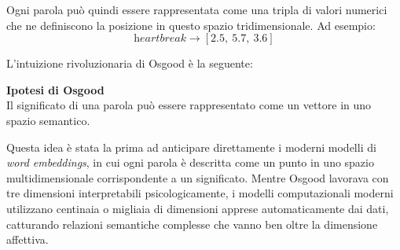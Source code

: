Ogni parola può quindi essere rappresentata come una tripla di valori numerici che ne definiscono la posizione in questo spazio tridimensionale. Ad esempio:
\[
\textit{heartbreak} \rightarrow [2.5,\ 5.7,\ 3.6]
\]

L'intuizione rivoluzionaria di Osgood è la seguente:

\begin{notebox}
\textbf{Ipotesi di Osgood}\\
Il significato di una parola può essere rappresentato come un vettore in uno spazio semantico.
\end{notebox}

Questa idea è stata la prima ad anticipare direttamente i moderni modelli di \textit{word embeddings}, in cui ogni parola è descritta come un punto in uno spazio multidimensionale corrispondente a un significato. Mentre Osgood lavorava con tre dimensioni interpretabili psicologicamente, i modelli computazionali moderni utilizzano centinaia o migliaia di dimensioni apprese automaticamente dai dati, catturando relazioni semantiche complesse che vanno ben oltre la dimensione affettiva.

